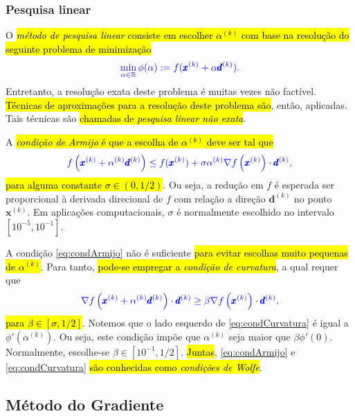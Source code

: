 \subsubsection{Pesquisa linear}
\badgeRevisar

O \hl{\emph{método de pesquisa linear} consiste em escolher $\alpha^{(k)}$ com base na resolução do seguinte problema de minimização}
\begin{equation}\color{blue}\min_{\alpha\in\mathbb{R}} \phi(\alpha) := f(\pmb{x}^{(k)}+\alpha \pmb{d}^{(k)}).
\end{equation}
Entretanto, a resolução exata deste problema é muitas vezes não factível. \hl{Técnicas de aproximações para a resolução deste problema são}, então, aplicadas. Tais técnicas são \hl{chamadas de \emph{pesquisa linear não exata}}.

A \hl{\emph{condição de Armijo} é que a escolha de $\alpha^{(k)}$ deve ser tal que}
\begin{equation} \label{eq:condArmijo}\color{blue}f\left(\pmb{x}^{(k)}+\alpha^{(k)} \pmb{d}^{(k)}\right) \leq f(\pmb{x}^{(k)}) + \sigma \alpha^{(k)} \nabla f\left(\pmb{x}^{(k)}\right)\cdot \pmb{d}^{(k)},
\end{equation}
\hl{para alguma constante $\sigma\in (0, 1/2)$}. Ou seja, a redução em $f$ é esperada ser proporcional à derivada direcional de $f$ com relação a direção $\pmb{d}^{(k)}$ no ponto $\pmb{x}^{(k)}$. Em aplicações computacionais, $\sigma$ é normalmente escolhido no intervalo $[10^{-5}, 10^{-1}]$.

A condição \eqref{eq:condArmijo} não é suficiente \hl{para evitar escolhas muito pequenas de $\alpha^{(k)}$}. Para tanto, \hl{pode-se empregar a \emph{condição de curvatura}}, a qual requer que
\begin{equation}\label{eq:condCurvatura}\color{blue}\nabla f\left(\pmb{x}^{(k)} + \alpha^{(k)}\pmb{d}^{(k)}\right)\cdot \pmb{d}^{(k)} \geq \beta\nabla f\left(\pmb{x}^{(k)}\right)\cdot\pmb{d}^{(k)},
\end{equation}
\hl{para $\beta\in [\sigma, 1/2]$}. Notemos que o lado esquerdo de \eqref{eq:condCurvatura} é igual a $\phi'(\alpha^{(k)})$. Ou seja, este condição impõe que $\alpha^{(k)}$ seja maior que $\beta\phi'(0)$. Normalmente, escolhe-se $\beta\in [10^{-1}, 1/2]$. \hl{Juntas}, \eqref{eq:condArmijo} e \eqref{eq:condCurvatura} \hl{são conhecidas como \emph{condições de Wolfe}}{\wolfe}.

\subsection{Método do Gradiente}
\badgeRevisar

